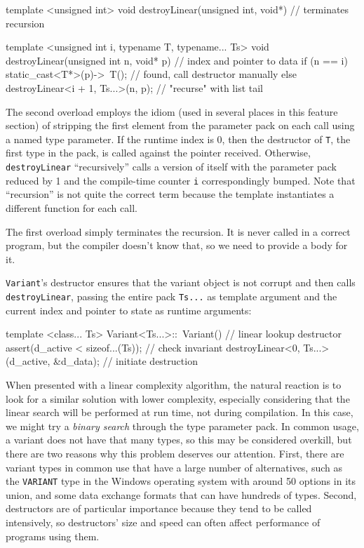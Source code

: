 \begin{emcppslisting}
template <unsigned int>
void destroyLinear(unsigned int, void*)      // terminates recursion
{ }

template <unsigned int i, typename T, typename... Ts>
void destroyLinear(unsigned int n, void* p)  // index and pointer to data
{
    if (n == i)
        static_cast<T*>(p)->~T();            // found, call destructor manually
    else
        destroyLinear<i + 1, Ts...>(n, p);   // "recurse" with list tail
}
\end{emcppslisting}
    

\noindent The second overload employs the idiom (used in several places in this
feature section) of stripping the first element from the parameter pack
on each call using a named type parameter. If the runtime index is 0,
then the destructor of \lstinline!T!, the first type in the pack, is called
against the pointer received. Otherwise, \lstinline!destroyLinear!
``recursively'' calls a version of itself with the parameter pack
reduced by 1 and the compile-time counter \lstinline!i! correspondingly
bumped. Note that ``recursion'' is not quite the correct term because
the template instantiates a different function for each call.

The first overload simply terminates the recursion. It is never called
in a correct program, but the compiler doesn't know that, so we need to
provide a body for it.

\lstinline!Variant!'s destructor ensures that the variant object is not
corrupt and then calls\linebreak%
\lstinline!destroyLinear!, passing the entire pack
\lstinline!Ts...! as template argument and the current index and pointer to
state as runtime arguments:

\begin{emcppslisting}
template <class... Ts>
Variant<Ts...>::~Variant()                       // linear lookup destructor
{
    assert(d_active < sizeof...(Ts));            // check invariant
    destroyLinear<0, Ts...>(d_active, &d_data);  // initiate destruction
}
\end{emcppslisting}
    

\noindent When presented with a linear complexity algorithm, the natural reaction
is to look for a similar solution with lower complexity, especially
considering that the linear search will be performed at run time, not
during compilation. In this case, we might try a \emph{binary search}
through the type parameter pack. In common usage, a variant does not
have that many types, so this may be considered overkill, but there are
two reasons why this problem deserves our attention. First, there are
variant types in common use that have a large number of alternatives,
such as the \lstinline!VARIANT! type in the Windows operating system with
around 50 options in its union, and some data exchange formats that can
have hundreds of types. Second, destructors are of particular importance
because they tend to be called intensively, so destructors' size and
speed can often affect performance of programs using them.

